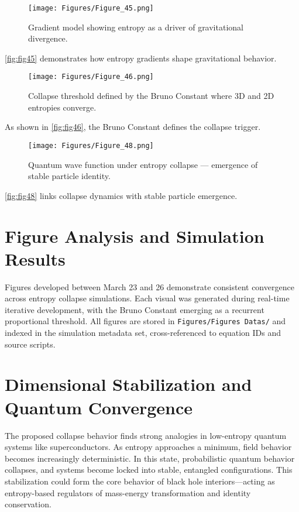 \documentclass[12pt]{article}
\begin{document}
\begin{figure}[H]
    \centering
    \texttt{[image: Figures/Figure\_45.png]}
    \caption{Gradient model showing entropy as a driver of gravitational divergence.}
    \label{fig:fig45}
\end{figure}
\autoref{fig:fig45} demonstrates how entropy gradients shape gravitational behavior.

\begin{figure}[H]
    \centering
    \texttt{[image: Figures/Figure\_46.png]}
    \caption{Collapse threshold defined by the Bruno Constant where 3D and 2D entropies converge.}
    \label{fig:fig46}
\end{figure}
As shown in \autoref{fig:fig46}, the Bruno Constant defines the collapse trigger.

\begin{figure}[H]
    \centering
    \texttt{[image: Figures/Figure\_48.png]}
    \caption{Quantum wave function under entropy collapse — emergence of stable particle identity.}
    \label{fig:fig48}
\end{figure}
\autoref{fig:fig48} links collapse dynamics with stable particle emergence.


\section{Figure Analysis and Simulation Results}
Figures developed between March 23 and 26 demonstrate consistent convergence across entropy collapse simulations. Each visual was generated during real-time iterative development, with the Bruno Constant emerging as a recurrent proportional threshold. All figures are stored in \texttt{Figures/Figures Datas/} and indexed in the simulation metadata set, cross-referenced to equation IDs and source scripts.

\section{Dimensional Stabilization and Quantum Convergence}
The proposed collapse behavior finds strong analogies in low-entropy quantum systems like superconductors. As entropy approaches a minimum, field behavior becomes increasingly deterministic. In this state, probabilistic quantum behavior collapses, and systems become locked into stable, entangled configurations. This stabilization could form the core behavior of black hole interiors—acting as entropy-based regulators of mass-energy transformation and identity conservation.
\end{document}
